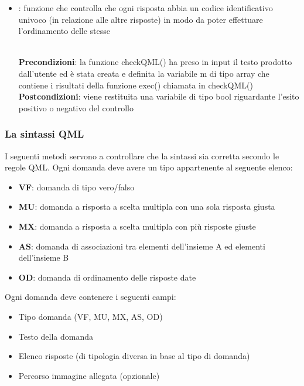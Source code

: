 \begin{itemize}
\begin{itemize}
		\item{}: funzione che controlla che ogni risposta abbia un codice identificativo univoco (in relazione alle altre risposte) in modo da poter effettuare l'ordinamento delle stesse\\
			\
				
				\textbf{Precondizioni}: la funzione checkQML() ha preso in input il testo prodotto dall'utente ed è stata creata e definita la variabile m di tipo array che contiene i risultati della funzione exec() chiamata in checkQML()\\
				\textbf{Postcondizioni}: viene restituita una variabile di tipo bool riguardante l'esito positivo o negativo del controllo\\
	\end{itemize}
\end{itemize}
\newpage

\subsubsection{La sintassi QML}
I seguenti metodi servono a controllare che la sintassi sia corretta secondo le regole QML.
Ogni domanda deve avere un tipo appartenente al seguente elenco:
\begin{itemize}
\item \textbf{VF}: domanda di tipo vero/falso
\item \textbf{MU}: domanda a risposta a scelta multipla con una sola risposta giusta
\item \textbf{MX}: domanda a risposta a scelta multipla con più risposte giuste
\item \textbf{AS}: domanda di associazioni tra elementi dell'insieme A ed elementi dell'insieme B
\item \textbf{OD}: domanda di ordinamento delle risposte date
\end{itemize}
Ogni domanda deve contenere i seguenti campi:
	\begin{itemize}
		\item Tipo domanda (VF, MU, MX, AS, OD)
		\item Testo della domanda
		\item Elenco risposte (di tipologia diversa in base al tipo di domanda)
		\item Percorso immagine allegata (opzionale)\\
	\end{itemize}

